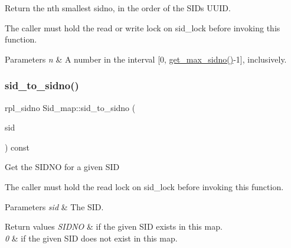 Return the n\textquotesingle{}th smallest sidno, in the order of the S\+ID\textquotesingle{}s U\+U\+ID.

The caller must hold the read or write lock on sid\+\_\+lock before invoking this function.


\begin{DoxyParams}{Parameters}
{\em n} & A number in the interval \mbox{[}0, \mbox{\hyperlink{classSid__map_a4e1dbe6bf6fbaf1d6c3199cd407a620c}{get\+\_\+max\+\_\+sidno()}}-\/1\mbox{]}, inclusively. \\
\hline
\end{DoxyParams}
\mbox{\label{classSid__map_a1667fd040c720d4ab8c35871f63926f4}} 
\subsubsection{\texorpdfstring{sid\+\_\+to\+\_\+sidno()}{sid\_to\_sidno()}}
{\footnotesize\ttfamily rpl\+\_\+sidno Sid\+\_\+map\+::sid\+\_\+to\+\_\+sidno (\begin{DoxyParamCaption}\item[{const rpl\+\_\+sid \&}]{sid }\end{DoxyParamCaption}) const\hspace{0.3cm}{\ttfamily [inline]}}

Get the S\+I\+D\+NO for a given S\+ID

The caller must hold the read lock on sid\+\_\+lock before invoking this function.


\begin{DoxyParams}{Parameters}
{\em sid} & The S\+ID. \\
\hline
\end{DoxyParams}

\begin{DoxyRetVals}{Return values}
{\em S\+I\+D\+NO} & if the given S\+ID exists in this map. \\
\hline
{\em 0} & if the given S\+ID does not exist in this map. \\
\hline
\end{DoxyRetVals}
\mbox{\label{classSid__map_ae9a138fb42883743ec9548a6e65a56f8}} 
